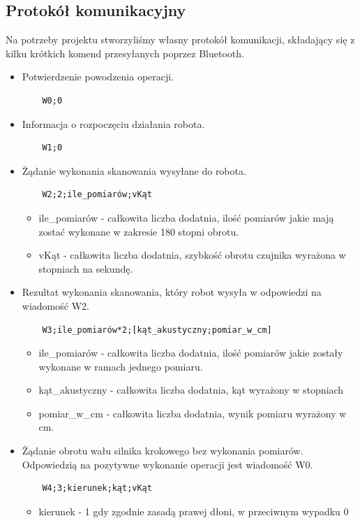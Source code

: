 \documentclass[a4paper]{article}
\begin{document}
\subsection{Protokół komunikacyjny}
Na potrzeby projektu stworzyliśmy własny protokół komunikacji, składający się z kilku krótkich komend przesyłanych poprzez Bluetooth. 
\begin{itemize}
\item Potwierdzenie powodzenia operacji. 
\begin{verbatim}
	W0;0
\end{verbatim}
\item Informacja o rozpoczęciu działania robota.
\begin{verbatim}
	W1;0
\end{verbatim}
\item Żądanie wykonania skanowania wysyłane do robota.
\begin{verbatim}
	W2;2;ile_pomiarów;vKąt
\end{verbatim}
	\begin{itemize}
	\item ile\_pomiarów - całkowita liczba dodatnia, ilość pomiarów jakie mają zostać wykonane w zakresie 180 stopni obrotu.
	\item vKąt - całkowita liczba dodatnia, szybkość obrotu czujnika wyrażona w stopniach na sekundę.
	\end{itemize}
\item Rezultat wykonania skanowania, który robot wysyła w odpowiedzi na wiadomość W2.
\begin{verbatim}
	W3;ile_pomiarów*2;[kąt_akustyczny;pomiar_w_cm]
\end{verbatim}
	\begin{itemize}
	\item ile\_pomiarów - całkowita liczba dodatnia, ilość pomiarów jakie zostały wykonane w ramach jednego pomiaru. 
	\item kąt\_akustyczny - całkowita liczba dodatnia, kąt wyrażony w stopniach
	\item pomiar\_w\_cm - całkowita liczba dodatnia, wynik pomiaru wyrażony w cm.
	\end{itemize}
\item Żądanie obrotu wału silnika krokowego bez wykonania pomiarów. Odpowiedzią na pozytywne wykonanie operacji jest wiadomość W0.
\begin{verbatim}
	W4;3;kierunek;kąt;vKąt
\end{verbatim}
	\begin{itemize}
	\item kierunek - 1 gdy zgodnie zasadą prawej dłoni, w przeciwnym wypadku 0

\end{itemize}
\end{itemize}
\end{document}
